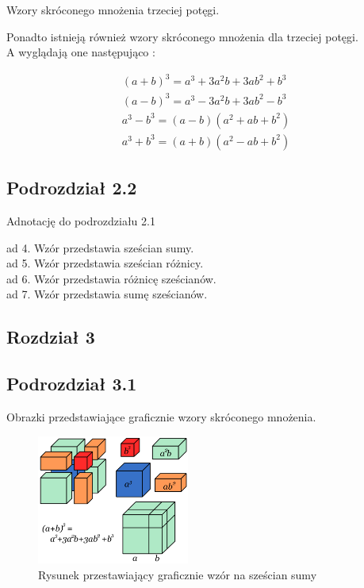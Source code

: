 \documentclass[11pt]{article}
\begin{document}
\begin{center}
Wzory skróconego mnożenia trzeciej potęgi.
\end{center}
\begin{flushleft}
Ponadto istnieją również wzory skróconego mnożenia dla trzeciej potęgi.\\
A wyglądają one następująco :
\end{flushleft}
\begin{flushleft}
\begin{eqnarray}
(a+b)^3 = a^3 + 3a^2b + 3ab^2 + b^3\\
(a-b)^3 = a^3 - 3a^2b + 3ab^2 - b^3\\
a^3 - b^3 = (a-b)(a^2+ab+b^2)\\
a^3 + b^3 = (a+b)(a^2-ab+b^2)
\end{eqnarray}
\end{flushleft}
\begin{center}
\subsection{Podrozdział 2.2}
\end{center}
\begin{center}
Adnotację do podrozdziału 2.1
\end{center}
ad 4. Wzór przedstawia sześcian sumy.\\
ad 5. Wzór przedstawia sześcian różnicy.\\
ad 6. Wzór przedstawia różnicę sześcianów.\\
ad 7. Wzór przedstawia sumę sześcianów.\\
\newpage
\begin{center}
\section{Rozdział 3}
\label{sec:3. obrazki}
\subsection{Podrozdział 3.1}
\end{center}
\begin{center}
Obrazki przedstawiające graficznie wzory skróconego mnożenia.
\end{center}
\begin{figure}[h]
\begin{center}
\includegraphics[width=5cm]{d.png}
\caption{Rysunek przestawiający graficznie wzór na sześcian sumy}
\end{center}
\end{figure}
\end{document}
